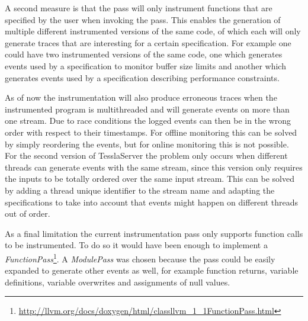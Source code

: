 A second measure is that the pass will only instrument functions that are specified by the user when invoking the pass.
This enables the generation of multiple different instrumented versions of the same code, of which each will only generate traces that are interesting for a certain specification.
For example one could have two instrumented versions of the same code, one which generates events used by a specification to monitor buffer size limits and another which generates events used by a specification describing performance constraints.

As of now the instrumentation will also produce erroneous traces when the instrumented program is multithreaded and will generate events on more than one stream.
Due to race conditions the logged events can then be in the wrong order with respect to their timestamps.
For offline monitoring this can be solved by simply reordering the events, but for online monitoring this is not possible.
For the second version of TesslaServer the problem only occurs when different threads can generate events with the same stream, since this version only requires the inputs to be totally ordered over the same input stream.
This can be solved by adding a thread unique identifier to the stream name and adapting the specifications to take into account that events might happen on different threads out of order.

As a final limitation the current instrumentation pass only supports function calls to be instrumented.
To do so it would have been enough to implement a \emph{FunctionPass}\footnote{\url{http://llvm.org/docs/doxygen/html/classllvm_1_1FunctionPass.html}}.
A \emph{ModulePass} was chosen because the pass could be easily expanded to generate other events as well, for example function returns, variable definitions, variable overwrites and assignments of null values.

